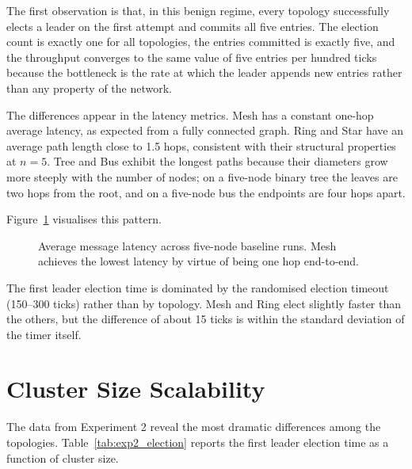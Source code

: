 The first observation is that, in this benign regime, every topology successfully elects a leader on the first attempt and commits all five entries. The election count is exactly one for all topologies, the entries committed is exactly five, and the throughput converges to the same value of five entries per hundred ticks because the bottleneck is the rate at which the leader appends new entries rather than any property of the network.

The differences appear in the latency metrics. Mesh has a constant one-hop average latency, as expected from a fully connected graph. Ring and Star have an average path length close to 1.5 hops, consistent with their structural properties at $n=5$. Tree and Bus exhibit the longest paths because their diameters grow more steeply with the number of nodes; on a five-node binary tree the leaves are two hops from the root, and on a five-node bus the endpoints are four hops apart.

Figure~\ref{fig:exp1_latency} visualises this pattern.

\begin{figure}[H]
\centering
{}
\caption{Average message latency across five-node baseline runs. Mesh achieves the lowest latency by virtue of being one hop end-to-end.}
\label{fig:exp1_latency}
\end{figure}

The first leader election time is dominated by the randomised election timeout (150--300 ticks) rather than by topology. Mesh and Ring elect slightly faster than the others, but the difference of about 15 ticks is within the standard deviation of the timer itself.

\section{Cluster Size Scalability}

The data from Experiment 2 reveal the most dramatic differences among the topologies. Table~\ref{tab:exp2_election} reports the first leader election time as a function of cluster size.

